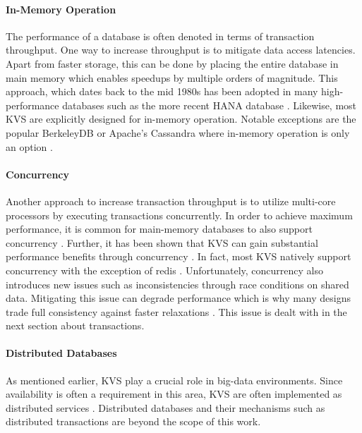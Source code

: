 \paragraph{In-Memory Operation}

The performance of a database is often denoted in terms of transaction
throughput. One way to increase throughput is to mitigate data access latencies.
Apart from faster storage, this can be done by placing the entire database in
main memory which enables speedups by multiple orders of magnitude. This
approach, which dates back to the mid 1980s has been adopted in many
high-performance databases such as the more recent HANA database
\cite{molina1992main, faerber2012hana}. Likewise, most KVS are explicitly
designed for in-memory operation. Notable exceptions are the popular BerkeleyDB
or Apache's Cassandra where in-memory operation is only an option
\cite{bdb2017doc, lakshman2010cassandra}.

\paragraph{Concurrency}

Another approach to increase transaction throughput is to utilize multi-core
processors by executing transactions concurrently. In order to achieve maximum
performance, it is common for main-memory databases to also support concurrency
\cite{grund2010hyrise, faerber2012hana, diaconu2013hekaton}. Further, it has
been shown that KVS can gain substantial performance benefits through
concurrency \cite{fan2013memc3, li2015architecting, xu2014building}. In fact,
most KVS natively support concurrency with the exception of redis
\cite{redis2017home}. Unfortunately, concurrency also introduces new issues such
as inconsistencies through race conditions on shared data. Mitigating this issue
can degrade performance which is why many designs trade full consistency against
faster relaxations \cite{decandia2007dynamo}. This issue is dealt with in the
next section about transactions.

\paragraph{Distributed Databases}

As mentioned earlier, KVS play a crucial role in big-data environments. Since
availability is often a requirement in this area, KVS are often implemented as
distributed services \cite{decandia2007dynamo, lakshman2010cassandra,
wang2015hydradb}. Distributed databases and their mechanisms such as distributed
transactions are beyond the scope of this work.


